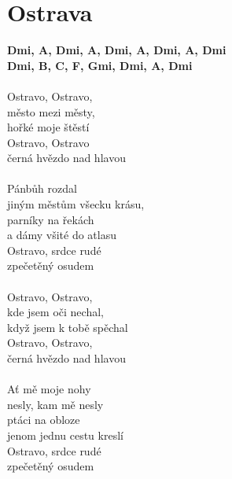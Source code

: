 \section{Ostrava}
\footnotesize\textbf{Dmi, A\7, Dmi, A\7, Dmi, A\7, Dmi, A\7, Dmi}\\
\textbf{Dmi, B\be, C, F, Gmi, Dmi, A\7, Dmi}\\
\\
\normalsize
{}Ostravo, Ostravo,\\
město mezi městy,\\
hořké moje štěstí\\
Ostravo, Ostravo\\
černá hvězdo nad hlavou\\
\\
Pánbůh rozdal\\
jiným městům všecku krásu,\\
parníky na řekách\\
a dámy všité do atlasu\\
Ostravo, srdce rudé\\
zpečetěný osudem\\
\\
Ostravo, Ostravo,\\
kde jsem oči nechal,\\
když jsem k tobě spěchal\\
Ostravo, Ostravo,\\
černá hvězdo nad hlavou\\
\\
Ať mě moje nohy\\
nesly, kam mě nesly\\
ptáci na obloze\\
jenom jednu cestu kreslí\\
Ostravo, srdce rudé\\
zpečetěný osudem\\
